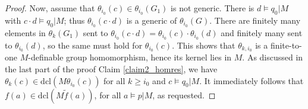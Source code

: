 \documentclass[12pt]{article}
\newcommand{\acl}{\mathrm{acl}}
\newcommand{\dcl}{\mathrm{dcl}}
\newcommand{\alg}{\mathrm{alg}}
\newcommand{\0}{\emptyset}
\newcommand{\rf}{\mathrm{k}}
\newcommand{\U}{\mathcal{U}}
\def\forkindep{\mathrel{\raise0.2ex\hbox{\ooalign{\hidewidth$\vert$\hidewidth\cr\raise-0.9ex\hbox{$\smile$}}}}}
\theoremstyle{plain}%
\theoremstyle{definition}
\theoremstyle{remark}
\begin{document}
\begin{proof}
 Now, assume that $\theta_{i_0}(c)\in\theta_{i_0}( G_1)$ is not generic. 
 There is $d\models q_0|M$ with $c\cdot d\models q_0|M$; thus $\theta_{i_0}(c\cdot d)$ is a generic of $\theta_{i_0}(G)$. There are finitely many elements in $\theta_k(G_1)$ sent to $\theta_{i_0}(c\cdot d)=\theta_{i_0}(c)\cdot\theta_{i_0}(d)$ and finitely many sent to $\theta_{i_0}(d)$, so the same must hold for $\theta_{i_0}(c)$. 
 This shows that $\theta_{k,i_0}$ is a finite-to-one $M$-definable group homomorphism, hence its kernel lies in $M$. As discussed in the last part of the proof Claim \ref{claim2_homres}, we have $\theta_k(c)\in \dcl(M\theta_{i_0}(c))$ for all $k\geq i_0$ and $c\models q_0|M$. It immediately follows that $f(a)\in \dcl(M\tilde{f}(a))$, for all $a\models p|M$, as requested. \end{proof}

 

 
 
 
 
\end{document}
